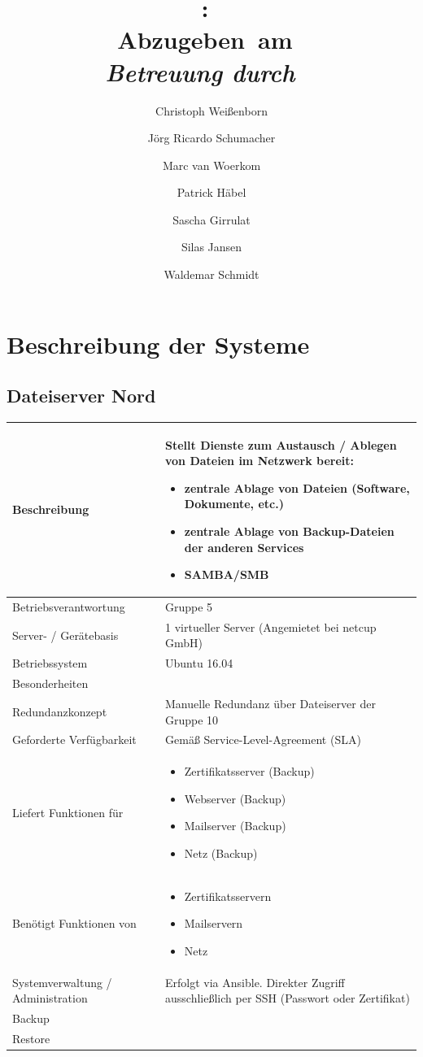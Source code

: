 \documentclass[]{article}
\title{
\vspace{0.2in} %
\textmd{\textbf{\Class:\ \Title}}\\
\normalsize\vspace{0.1in}\small{Abzugeben\ am\ \DueDate}\\
\vspace{0.1in}\large{\textit{Betreuung durch \ClassInstructor\ \ClassTime}}
\vspace{3in} %
}
\author[1]{Christoph Weißenborn}
\author[1]{Jörg Ricardo Schumacher}
\author[1]{Marc van Woerkom}
\author[1]{Patrick Häbel}
\author[2]{Sascha Girrulat}
\author[2]{Silas Jansen}
\author[1]{Waldemar Schmidt}
\affil[1]{Gruppe 5 (Nord)}
\affil[2]{Gruppe 10 (Süd)}
\date{} %
\begin{document}
\maketitle



\newpage
\tableofcontents
\newpage
\section{Beschreibung der Systeme}\label{beschreibung-der-systeme}

\subsection{Dateiserver Nord}\label{dateiserver-nord}

\begin{longtable}{l|p{8cm}}
\toprule
Beschreibung & Stellt Dienste zum Austausch / Ablegen von Dateien im
Netzwerk bereit:

\begin{itemize}
\item
  zentrale Ablage von Dateien (Software, Dokumente, etc.)
\item
  zentrale Ablage von Backup-Dateien der anderen Services
\item
  SAMBA/SMB
\end{itemize}\tabularnewline
\midrule
Betriebsverantwortung & Gruppe 5\tabularnewline
Server- / Gerätebasis & 1 virtueller Server (Angemietet bei netcup
GmbH)\tabularnewline
Betriebssystem & Ubuntu 16.04\tabularnewline
Besonderheiten &\tabularnewline
Redundanzkonzept & Manuelle Redundanz über Dateiserver der Gruppe
10\tabularnewline
Geforderte Verfügbarkeit & Gemäß Service-Level-Agreement (SLA)\tabularnewline
Liefert Funktionen für & \begin{itemize}
\item
  Zertifikatsserver (Backup)
\item
  Webserver (Backup)
\item
  Mailserver (Backup)
\item
  Netz (Backup)
\end{itemize}\tabularnewline
Benötigt Funktionen von & \begin{itemize}
\item
  Zertifikatsservern
\item
  Mailservern
\item
  Netz
\end{itemize}\tabularnewline
Systemverwaltung / Administration & Erfolgt via Ansible. Direkter Zugriff ausschließlich per SSH (Passwort oder Zertifikat)\tabularnewline
Backup &\tabularnewline
Restore &\tabularnewline
\bottomrule
\end{longtable}
\end{document}
